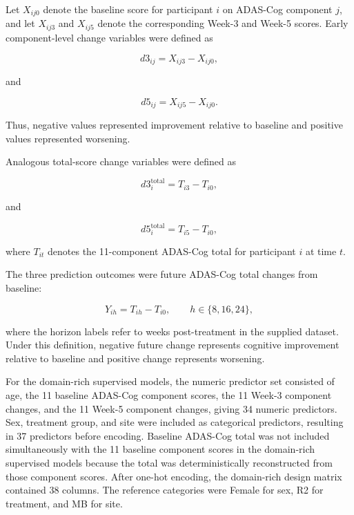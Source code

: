 \documentclass[11pt]{article}
\begin{document}
Let $X_{ij0}$ denote the baseline score for participant $i$ on ADAS-Cog component $j$,
and let $X_{ij3}$ and $X_{ij5}$ denote the corresponding Week-3 and Week-5 scores.
Early component-level change variables were defined as

\begin{equation}
d3_{ij}=X_{ij3}-X_{ij0},
\end{equation}

and

\begin{equation}
d5_{ij}=X_{ij5}-X_{ij0}.
\end{equation}

Thus, negative values represented improvement relative to baseline and positive values
represented worsening.

Analogous total-score change variables were defined as

\begin{equation}
d3^{\mathrm{total}}_i
=
T_{i3}-T_{i0},
\end{equation}

and

\begin{equation}
d5^{\mathrm{total}}_i
=
T_{i5}-T_{i0},
\end{equation}

where $T_{it}$ denotes the 11-component ADAS-Cog total for participant $i$ at time $t$.

The three prediction outcomes were future ADAS-Cog total changes from baseline:

\begin{equation}
Y_{ih}=T_{ih}-T_{i0},
\qquad
h\in\{8,16,24\},
\end{equation}

where the horizon labels refer to weeks post-treatment in the supplied dataset. Under this
definition, negative future change represents cognitive improvement relative to baseline and
positive change represents worsening.



For the domain-rich supervised models, the numeric predictor set consisted of age,
the 11 baseline ADAS-Cog component scores, the 11 Week-3 component changes, and the
11 Week-5 component changes, giving 34 numeric predictors. Sex, treatment group, and
site were included as categorical predictors, resulting in 37 predictors before encoding. Baseline ADAS-Cog total was not included simultaneously with the 11 baseline component scores
in the domain-rich supervised models because the total was deterministically reconstructed
from those component scores. After one-hot encoding, the domain-rich design matrix contained
38 columns. The reference categories were Female for sex, R2 for treatment, and MB for site.
\end{document}
